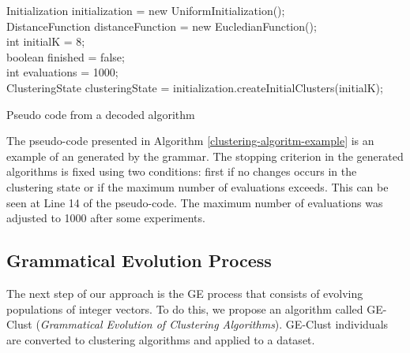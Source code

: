 \documentclass[conference]{IEEEtran}
\begin{document}
	
	\begin{algorithm}[!htb]
		\label{clustering-algoritm-example}
		Initialization initialization = new UniformInitialization(); \\
		DistanceFunction distanceFunction = new EucledianFunction(); \\
		int initialK = 8; \\
		boolean finished = false; \\
		int evaluations = 1000;\\
		ClusteringState 
		clusteringState = initialization.createInitialClusters(initialK); \\
		\caption{Pseudo code from a decoded algorithm}
	\end{algorithm}
	
	
	The pseudo-code presented in Algorithm \ref{clustering-algoritm-example} is an example of an  generated by the grammar. The stopping criterion in the generated algorithms is fixed using two conditions: first if no changes occurs in the clustering state or if the maximum number of evaluations exceeds. This can be seen at Line 14 of the pseudo-code. The maximum number of evaluations was adjusted to 1000 after some experiments.
	
	
	\subsection{Grammatical Evolution Process}
	
	
	The next step of our approach is the GE process that consists of evolving populations of integer vectors. To do this, we propose an algorithm called GE-Clust ({\it Grammatical Evolution of Clustering Algorithms}). GE-Clust individuals are converted to clustering algorithms and applied to a dataset.
	
\end{document}
